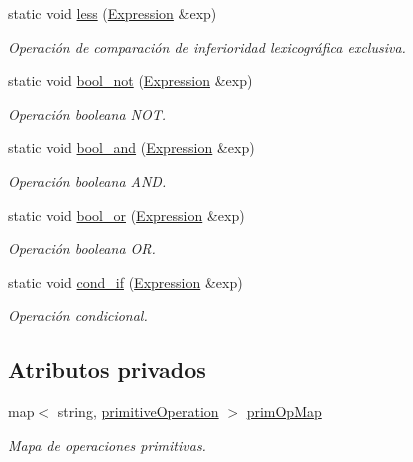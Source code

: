 \begin{DoxyCompactItemize}
static void \hyperlink{class_primitive_operation_space_aa5b70cdd115a646d48f686fd49cdedb1}{less} (\hyperlink{class_expression}{Expression} \&exp)
\begin{DoxyCompactList}\small\item\em Operación de comparación de inferioridad lexicográfica exclusiva. \end{DoxyCompactList}\item 
static void \hyperlink{class_primitive_operation_space_afcb171950067a1a6638b01c916900c78}{bool\+\_\+not} (\hyperlink{class_expression}{Expression} \&exp)
\begin{DoxyCompactList}\small\item\em Operación booleana N\+OT. \end{DoxyCompactList}\item 
static void \hyperlink{class_primitive_operation_space_a741c40c2ced4d13a87b4ee5c849abdfd}{bool\+\_\+and} (\hyperlink{class_expression}{Expression} \&exp)
\begin{DoxyCompactList}\small\item\em Operación booleana A\+ND. \end{DoxyCompactList}\item 
static void \hyperlink{class_primitive_operation_space_abb131ec0899228bc3fe2ed54d5c0ebc9}{bool\+\_\+or} (\hyperlink{class_expression}{Expression} \&exp)
\begin{DoxyCompactList}\small\item\em Operación booleana OR. \end{DoxyCompactList}\item 
static void \hyperlink{class_primitive_operation_space_abbb7fc1afddfa5c5041ac8adfa4a2d55}{cond\+\_\+if} (\hyperlink{class_expression}{Expression} \&exp)
\begin{DoxyCompactList}\small\item\em Operación condicional. \end{DoxyCompactList}\end{DoxyCompactItemize}
\subsection*{Atributos privados}
\begin{DoxyCompactItemize}
\item 
map$<$ string, \hyperlink{class_primitive_operation_space_a09c5a4b643964f8e61f797460dc6e765}{primitive\+Operation} $>$ \hyperlink{class_primitive_operation_space_afd359615001ed1e9b44b9618287834ec}{prim\+Op\+Map}
\begin{DoxyCompactList}\small\item\em Mapa de operaciones primitivas. \end{DoxyCompactList}\end{DoxyCompactItemize}


